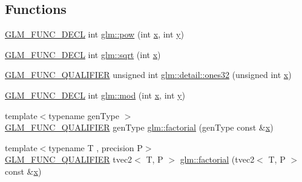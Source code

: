 \subsection*{Functions}
\begin{DoxyCompactItemize}
\item 
\mbox{\hyperlink{setup_8hpp_ab2d052de21a70539923e9bcbf6e83a51}{G\+L\+M\+\_\+\+F\+U\+N\+C\+\_\+\+D\+E\+CL}} int \mbox{\hyperlink{group__gtx__integer_ga9642514a44a67afa70966d756f040ca9}{glm\+::pow}} (int \mbox{\hyperlink{glad_8h_a92d0386e5c19fb81ea88c9f99644ab1d}{x}}, int \mbox{\hyperlink{glad_8h_a66ddd433d2cacfe27f5906b7e86faeed}{y}})
\item 
\mbox{\hyperlink{setup_8hpp_ab2d052de21a70539923e9bcbf6e83a51}{G\+L\+M\+\_\+\+F\+U\+N\+C\+\_\+\+D\+E\+CL}} int \mbox{\hyperlink{group__gtx__integer_ga78e2e68330e91d350fcfc2f4831cad12}{glm\+::sqrt}} (int \mbox{\hyperlink{glad_8h_a92d0386e5c19fb81ea88c9f99644ab1d}{x}})
\item 
\mbox{\hyperlink{setup_8hpp_a33fdea6f91c5f834105f7415e2a64407}{G\+L\+M\+\_\+\+F\+U\+N\+C\+\_\+\+Q\+U\+A\+L\+I\+F\+I\+ER}} unsigned int \mbox{\hyperlink{namespaceglm_1_1detail_a2699e3b3ea6ad8d4bb99aed56761582c}{glm\+::detail\+::ones32}} (unsigned int \mbox{\hyperlink{glad_8h_a92d0386e5c19fb81ea88c9f99644ab1d}{x}})
\item 
\mbox{\hyperlink{setup_8hpp_ab2d052de21a70539923e9bcbf6e83a51}{G\+L\+M\+\_\+\+F\+U\+N\+C\+\_\+\+D\+E\+CL}} int \mbox{\hyperlink{group__gtx__integer_gab9d22df91aac4d9eb925a4910f556f1b}{glm\+::mod}} (int \mbox{\hyperlink{glad_8h_a92d0386e5c19fb81ea88c9f99644ab1d}{x}}, int \mbox{\hyperlink{glad_8h_a66ddd433d2cacfe27f5906b7e86faeed}{y}})
\item 
{\footnotesize template$<$typename gen\+Type $>$ }\\\mbox{\hyperlink{setup_8hpp_a33fdea6f91c5f834105f7415e2a64407}{G\+L\+M\+\_\+\+F\+U\+N\+C\+\_\+\+Q\+U\+A\+L\+I\+F\+I\+ER}} gen\+Type \mbox{\hyperlink{group__gtx__integer_ga8cbd3120905f398ec321b5d1836e08fb}{glm\+::factorial}} (gen\+Type const \&\mbox{\hyperlink{glad_8h_a92d0386e5c19fb81ea88c9f99644ab1d}{x}})
\item 
{\footnotesize template$<$typename T , precision P$>$ }\\\mbox{\hyperlink{setup_8hpp_a33fdea6f91c5f834105f7415e2a64407}{G\+L\+M\+\_\+\+F\+U\+N\+C\+\_\+\+Q\+U\+A\+L\+I\+F\+I\+ER}} tvec2$<$ T, P $>$ \mbox{\hyperlink{namespaceglm_a2413666012b76baf1d3f0c44002f1154}{glm\+::factorial}} (tvec2$<$ T, P $>$ const \&\mbox{\hyperlink{glad_8h_a92d0386e5c19fb81ea88c9f99644ab1d}{x}})

\end{DoxyCompactItemize}
